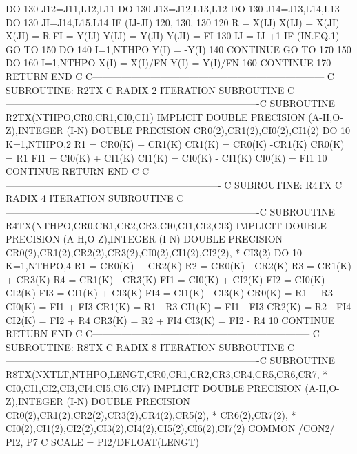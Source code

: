       DO 130 J12=J11,L12,L11
      DO 130 J13=J12,L13,L12
      DO 130 J14=J13,L14,L13
      DO 130 JI=J14,L15,L14
         IF (IJ-JI) 120, 130, 130
 120     R = X(IJ)
         X(IJ) = X(JI)
         X(JI) = R
         FI = Y(IJ)
         Y(IJ) = Y(JI)
         Y(JI) = FI
 130     IJ = IJ +1
       IF (IN.EQ.1) GO TO 150
       DO 140 I=1,NTHPO
         Y(I) = -Y(I)
 140   CONTINUE
       GO TO 170
 150   DO 160 I=1,NTHPO
         X(I) = X(I)/FN
         Y(I) = Y(I)/FN
 160   CONTINUE
 170   RETURN
       END
C
C------------------------------------------------------------------------
C SUBROUTINE: R2TX
C RADIX 2 ITERATION SUBROUTINE
C-------------------------------------------------------------------------------C
      SUBROUTINE R2TX(NTHPO,CR0,CR1,CI0,CI1)
      IMPLICIT DOUBLE PRECISION (A-H,O-Z),INTEGER (I-N)
      DOUBLE PRECISION CR0(2),CR1(2),CI0(2),CI1(2)
      DO 10 K=1,NTHPO,2
         R1 = CR0(K) + CR1(K)
         CR1(K) = CR0(K) -CR1(K)
         CR0(K) = R1
         FI1 = CI0(K) + CI1(K)
         CI1(K) = CI0(K) - CI1(K)
         CI0(K) = FI1
 10   CONTINUE
      RETURN
      END
C
C-------------------------------------------------------------------
C SUBROUTINE: R4TX
C RADIX 4 ITERATION SUBROUTINE
C-------------------------------------------------------------------------------C
      SUBROUTINE R4TX(NTHPO,CR0,CR1,CR2,CR3,CI0,CI1,CI2,CI3)
      IMPLICIT DOUBLE PRECISION (A-H,O-Z),INTEGER (I-N)
      DOUBLE PRECISION CR0(2),CR1(2),CR2(2),CR3(2),CI0(2),CI1(2),CI2(2),
     *    CI3(2)
      DO 10 K=1,NTHPO,4
        R1 = CR0(K) + CR2(K)
        R2 = CR0(K) - CR2(K)
        R3 = CR1(K) + CR3(K)
        R4 = CR1(K) - CR3(K)
        FI1 = CI0(K) + CI2(K)
        FI2 = CI0(K) - CI2(K)
        FI3 = CI1(K) + CI3(K)
        FI4 = CI1(K) - CI3(K)
        CR0(K) = R1 + R3
        CI0(K) = FI1 + FI3
        CR1(K) = R1 - R3
        CI1(K) = FI1 - FI3
        CR2(K) = R2 - FI4
        CI2(K) = FI2 + R4
        CR3(K) = R2 + FI4
        CI3(K) = FI2 - R4
 10   CONTINUE
      RETURN
      END
C
C--------------------------------------------------------------------
C SUBROUTINE: R8TX
C RADIX 8 ITERATION SUBROUTINE
C-------------------------------------------------------------------------------C
      SUBROUTINE R8TX(NXTLT,NTHPO,LENGT,CR0,CR1,CR2,CR3,CR4,CR5,CR6,CR7,
     *    CI0,CI1,CI2,CI3,CI4,CI5,CI6,CI7)
      IMPLICIT DOUBLE PRECISION (A-H,O-Z),INTEGER (I-N)
      DOUBLE PRECISION CR0(2),CR1(2),CR2(2),CR3(2),CR4(2),CR5(2),
     *    CR6(2),CR7(2),
     *    CI0(2),CI1(2),CI2(2),CI3(2),CI4(2),CI5(2),CI6(2),CI7(2)
      COMMON /CON2/ PI2, P7
C
      SCALE = PI2/DFLOAT(LENGT)

